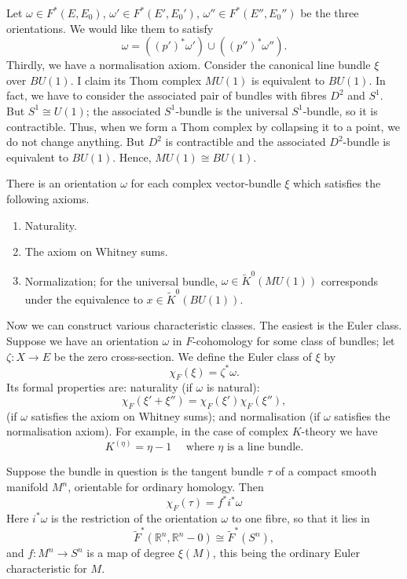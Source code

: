 \documentclass[../main]{subfiles}
\begin{document}
Let $\omega\in F^*(E,E_0)$, $\omega'\in F^*(E',E_0')$, $\omega''\in F^*(E'',E_0'')$ be the three orientations. We would like them to satisfy
$$\omega = ((p')^*\omega')\cup((p'')^*\omega'').$$
Thirdly, we have a normalisation axiom. Consider the canonical line bundle $\xi$ over $BU(1)$. I claim its Thom complex $MU(1)$ is equivalent to $BU(1)$. In fact, we have to consider the associated pair of bundles with fibres $D^2$ and $S^1$. But $S^1\cong U(1)$; the associated $S^1$-bundle is the universal $S^1$-bundle, so it is contractible. Thus, when we form a Thom complex by collapsing it to a point, we do not change anything. But $D^2$ is contractible and the associated $D^2$-bundle is equivalent to $BU(1)$. Hence, $MU(1)\cong BU(1)$.
\begin{proposition}\label{prop:p3ch11.3}
There is an orientation $\omega$ for each complex vector-bundle $\xi$ which satisfies the following axioms.
\begin{enumerate}
    \item Naturality.
    \item The axiom on Whitney sums.
    \item Normalization; for the universal bundle, $\omega \in \tilde{K}^0(MU(1))$ corresponds under the equivalence to $x\in \tilde{K}^0(BU(1))$. 
\end{enumerate}
\end{proposition}
\par Now we can construct various characteristic classes. The easiest is the Euler class. Suppose we have an orientation $\omega$ in $F$-cohomology for some class of bundles; let $\zeta:X\longrightarrow E$ be the zero cross-section. We define the Euler class of $\xi$ by
$$\chi_F(\xi)=\zeta^*\omega.$$
Its formal properties are: naturality (if $\omega$ is natural):
$$\chi_F(\xi'+\xi'')=\chi_F(\xi')\chi_F(\xi''),$$
(if $\omega$ satisfies the axiom on Whitney sums); and normalisation (if $\omega$ satisfies the normalisation axiom). For example, in the case of complex $K$-theory we have $$K^{(\eta)}=\eta-1 \quad \text{ where } \eta \text{ is a line bundle.} $$
\begin{proposition}\label{prop:p3ch11.4}
Suppose the bundle in question is the tangent bundle $\tau$ of a compact smooth manifold $M^n$, orientable for ordinary homology. Then
$$\chi_F(\tau)=f^*i^*\omega$$
Here $i^*\omega$ is the restriction of the orientation $\omega$ to one fibre, so that it lies in 
$$\tilde{F}^*(\mathbb{R}^n, \mathbb{R}^n-0)\cong \tilde{F}^*(S^n),$$
and $f:M^n\longrightarrow S^n$ is a map of degree $\xi(M)$, this being the ordinary Euler characteristic for $M$.
\end{proposition}
\end{document}
